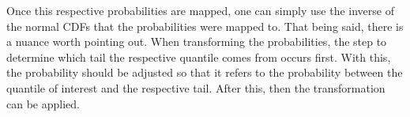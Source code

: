 
Once this respective probabilities are mapped, one can simply use the inverse of the normal CDFs that the probabilities were mapped to. That being said, there is a nuance worth pointing out. When transforming the probabilities, the step to determine which tail the respective quantile comes from occurs first. With this, the probability should be adjusted so that it refers to the probability between the quantile of interest and the respective tail. After this, then the transformation can be applied.

